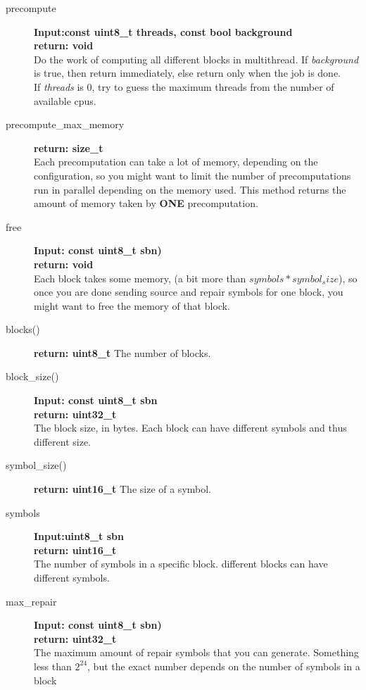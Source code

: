 \documentclass[11pt,a4paper]{refart}
\begin{document}
\begin{description}
\item[precompute] \textbf{Input:const uint8\_t threads, const bool background}\\
\textbf{return: void}\\
Do the work of computing all different blocks in multithread. If \textit{background} is true, then return immediately, else return only when the job is done.\\
If \textit{threads} is $0$, try to guess the maximum threads from the number of available cpus.

\item [precompute\_max\_memory] \textbf{return: size\_t}\\
Each precomputation can take a lot of memory, depending on the configuration, so you might want to limit the number of precomputations run in parallel
depending on the memory used. This method returns the amount of memory taken by \textbf{ONE} precomputation.

\item [free] \textbf{Input: const uint8\_t sbn)}\\
\textbf{return: void}\\
Each block takes some memory, (a bit more than $symbols * symbol_size$), so once you are done sending source and repair symbols for one block,
you might want to free the memory of that block.

\item[blocks()] \textbf{return: uint8\_t} The number of blocks.

\item[block\_size()] \textbf{Input: const uint8\_t sbn}\\
\textbf{return: uint32\_t}\\
The block size, in bytes. Each block can have different symbols and thus different size.

\item[symbol\_size()] \textbf{return: uint16\_t} The size of a symbol.

\item[symbols] \textbf{Input:uint8\_t sbn}\\
\textbf{return: uint16\_t}\\
The number of symbols in a specific block. different blocks can have different symbols.

\item[max\_repair] \textbf{Input: const uint8\_t sbn)}\\
\textbf{return: uint32\_t}\\
The maximum amount of repair symbols that you can generate. Something less than $2^{24}$, but the exact number depends on the number of symbols
in a block
\end{description}
\end{document}
